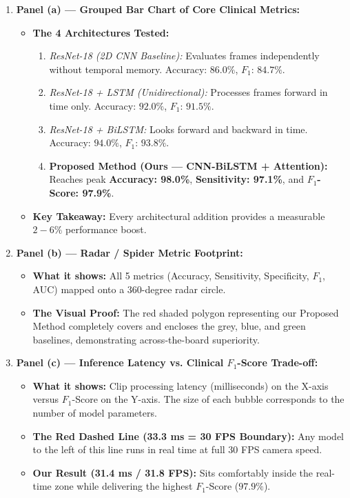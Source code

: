\documentclass[11pt,a4paper]{article}
\begin{document}
\begin{enumerate}
    \item \textbf{Panel (a) --- Grouped Bar Chart of Core Clinical Metrics:}
    \begin{itemize}
        \item \textbf{The 4 Architectures Tested:}
        \begin{enumerate}
            \item \textit{ResNet-18 (2D CNN Baseline):} Evaluates frames independently without temporal memory. Accuracy: $86.0\%$, $F_1$: $84.7\%$.
            \item \textit{ResNet-18 + LSTM (Unidirectional):} Processes frames forward in time only. Accuracy: $92.0\%$, $F_1$: $91.5\%$.
            \item \textit{ResNet-18 + BiLSTM:} Looks forward and backward in time. Accuracy: $94.0\%$, $F_1$: $93.8\%$.
            \item \textbf{Proposed Method (Ours --- CNN-BiLSTM + Attention):} Reaches peak \textbf{Accuracy: 98.0\%}, \textbf{Sensitivity: 97.1\%}, and \textbf{$F_1$-Score: 97.9\%}.
        \end{enumerate}
        \item \textbf{Key Takeaway:} Every architectural addition provides a measurable $2-6\%$ performance boost.
    \end{itemize}

    \item \textbf{Panel (b) --- Radar / Spider Metric Footprint:}
    \begin{itemize}
        \item \textbf{What it shows:} All 5 metrics (Accuracy, Sensitivity, Specificity, $F_1$, AUC) mapped onto a 360-degree radar circle.
        \item \textbf{The Visual Proof:} The red shaded polygon representing our Proposed Method completely covers and encloses the grey, blue, and green baselines, demonstrating across-the-board superiority.
    \end{itemize}

    \item \textbf{Panel (c) --- Inference Latency vs. Clinical $F_1$-Score Trade-off:}
    \begin{itemize}
        \item \textbf{What it shows:} Clip processing latency (milliseconds) on the X-axis versus $F_1$-Score on the Y-axis. The size of each bubble corresponds to the number of model parameters.
        \item \textbf{The Red Dashed Line (33.3 ms = 30 FPS Boundary):} Any model to the left of this line runs in real time at full 30 FPS camera speed.
        \item \textbf{Our Result (31.4 ms / 31.8 FPS):} Sits comfortably inside the real-time zone while delivering the highest $F_1$-Score ($97.9\%$).
    \end{itemize}


\end{enumerate}
\end{document}
